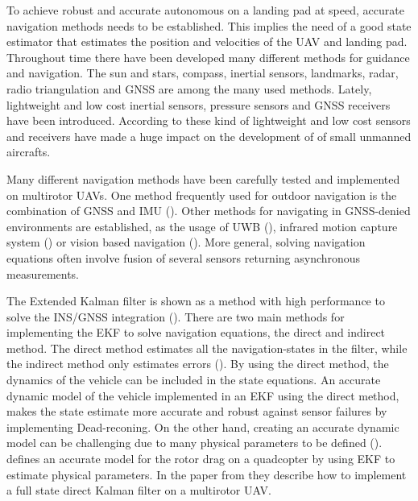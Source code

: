 To achieve robust and accurate autonomous on a landing pad at speed, accurate navigation methods needs to be established. This implies the need of a good state estimator that estimates the position and velocities of the \gls{UAV} and landing pad. Throughout time there have been developed many different methods for guidance and navigation. The sun and stars, compass, inertial sensors, landmarks, radar, radio triangulation and \gls{GNSS} are among the many used methods. Lately, lightweight and low cost inertial sensors, pressure sensors and \gls{GNSS} receivers have been introduced. According to \cite{beard2012small} these kind of lightweight and low cost sensors and receivers have made a huge impact on the development of of small unmanned aircrafts.

Many different navigation methods have been carefully tested and implemented on multirotor \glspl{UAV}. One method frequently used for outdoor navigation is the combination of \gls{GNSS} and \gls{IMU} (\cite{beard2012small}). Other methods for navigating in \gls{GNSS}-denied environments are established, as the usage of \gls{UWB} (\cite{tiemann2015design}), infrared motion capture system (\cite{zou2016development}) or vision based navigation (\cite{huang2015monocular}). More general, solving navigation equations often involve fusion of several sensors returning asynchronous measurements.

The Extended Kalman filter is shown as a method with high performance to solve the \gls{INS}/\gls{GNSS} integration (\cite{groves2013principles}). There are two main methods for implementing the \gls{EKF} to solve navigation equations, the direct and indirect method. The direct method estimates all the navigation-states in the filter, while the indirect method only estimates errors (\cite{vik2009integrated}). By using the direct method, the dynamics of the vehicle can be included in the state equations. An accurate dynamic model of the vehicle implemented in an \gls{EKF} using the direct method, makes the state estimate more accurate and robust against sensor failures by implementing Dead-reconing. On the other hand, creating an accurate dynamic model can be challenging due to many physical parameters to be defined (\cite{roumeliotis1999circumventing}). \cite{martin2010true} defines an accurate model for the rotor drag on a quadcopter by using \gls{EKF} to estimate physical parameters. In the paper from \cite{tailanian2014design} they describe how to implement a full state direct Kalman filter on a multirotor \gls{UAV}.

